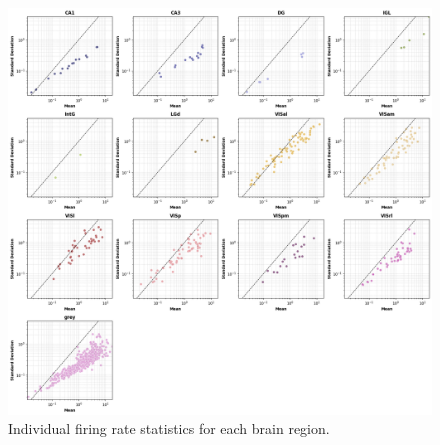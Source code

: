 \documentclass[10pt,twocolumn]{article}
\begin{document}
\begin{figure}[H]
  \centering
  \includegraphics[width=\linewidth]{report_images/unit_firing_rate_statistics_single.png}
  \caption{Individual firing rate statistics for each brain region.}
  \label{fig:firing_rate_single}
\end{figure}
\end{document}
